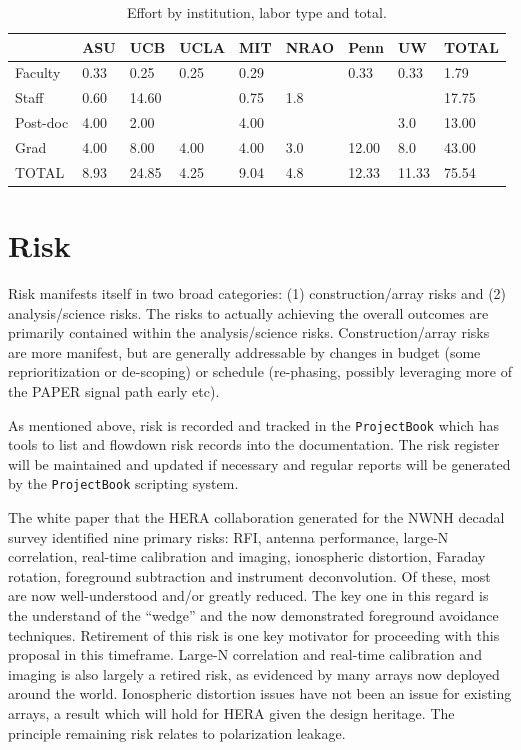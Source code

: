 \documentclass[preprint]{aastex}
\begin{document}
\begin{table}[htb]
\begin{tabular}{| p{0.6in}  |  p{0.5in}  |p{0.5in}  |p{0.5in}  |p{0.5in}  |p{0.5in}  |p{0.5in}  |p{0.5in}  | p{0.5in}  |} \hline
                 &  ASU & UCB    &  UCLA  &  MIT  & NRAO  &  Penn  & UW  & TOTAL \\ \hline
Faculty     &  0.33  & 0.25    &   0.25   &  0.29  &              & 0.33    & 0.33  &  1.79  \\ \hline
Staff         &  0.60  & 14.60  &              &  0.75  &  1.8      &            &           &  17.75  \\ \hline
Post-doc  &   4.00 &  2.00   &              &   4.00  &            &            &  3.0    &   13.00  \\ \hline
Grad        &   4.00  & 8.00   &   4.00     &  4.00  &  3.0     & 12.00   &  8.0    &  43.00 \\ \hline
TOTAL     &   8.93  & 24.85  &  4.25    &   9.04  &  4.8     &  12.33  & 11.33  & 75.54 \\ \hline
\end{tabular}
\caption{Effort by institution, labor type and total.}
\label{tab:ftetot}
\end{table}

\section{Risk}
\label{sec:risk}
Risk manifests itself in two broad categories: (1) construction/array risks and (2)
analysis/science risks. The risks to actually achieving the overall outcomes are
primarily contained within the analysis/science risks. Construction/array risks are
more manifest, but are generally addressable by changes in budget (some
reprioritization or de-scoping) or schedule (re-phasing, possibly leveraging more of
the PAPER signal path early etc).

As mentioned above, risk is recorded and tracked in the {\tt ProjectBook} which has tools 
to list and flowdown risk records into the documentation.  The risk register will be 
maintained and updated if necessary and regular reports will be generated by the
{\tt ProjectBook} scripting system.

The white paper that the HERA collaboration generated for the NWNH decadal survey identified nine
primary risks:  RFI, antenna performance, large-N correlation, real-time calibration and imaging, 
ionospheric distortion, Faraday rotation, foreground subtraction and instrument deconvolution.
Of these, most are now well-understood and/or greatly reduced.  The key one in this regard is
the understand of the ``wedge'' and the now demonstrated foreground avoidance techniques.
Retirement of this risk is one key motivator for proceeding with this proposal in this
timeframe.  Large-N correlation and real-time calibration and imaging is also largely a
retired risk, as evidenced by many arrays now deployed around the world.  Ionospheric
distortion issues have not been an issue for existing arrays, a result which will hold for
HERA given the design heritage.  The principle remaining risk relates to polarization leakage.
\end{document}
